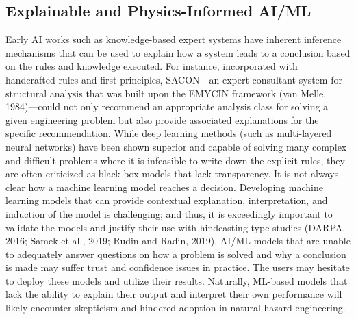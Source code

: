 \subsection{Explainable and Physics-Informed AI/ML}

Early AI works such as knowledge-based expert systems have inherent inference mechanisms that can be used to explain how a system leads to a conclusion based on the rules and knowledge executed. For instance, incorporated with handcrafted rules and first principles, SACON\citep{bennett1978}—an expert consultant system for structural analysis that was built upon the EMYCIN framework (van Melle, 1984)—could not only recommend an appropriate analysis class for solving a given engineering problem but also provide associated explanations for the specific recommendation. While deep learning methods (such as multi-layered neural networks) have been shown superior and capable of solving many complex and difficult problems where it is infeasible to write down the explicit rules, they are often criticized as black box models that lack transparency. It is not always clear how a machine learning model reaches a decision. Developing machine learning models that can provide contextual explanation, interpretation, and induction of the model is challenging; and thus, it is exceedingly important to validate the models and justify their use with hindcasting-type studies (DARPA, 2016; Samek et al., 2019; Rudin and Radin, 2019). AI/ML models that are unable to adequately answer questions on how a problem is solved and why a conclusion is made may suffer trust and confidence issues in practice. The users may hesitate to deploy these models and utilize their results. Naturally, ML-based models that lack the ability to explain their output and interpret their own performance will likely encounter skepticism and hindered adoption in natural hazard engineering. 

